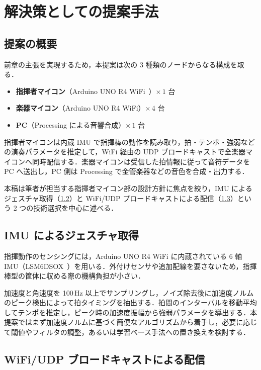 \section{解決策としての提案手法}
\label{sec:proposal}

\subsection{提案の概要}
\label{subsec:overview}

前章の主張を実現するため，本提案は次の 3 種類のノードからなる構成を取る．

\begin{itemize}
  \item \textbf{指揮者マイコン}（Arduino UNO R4 WiFi~\cite{arduino_uno_r4}）$\times\,1$ 台
  \item \textbf{楽器マイコン}（Arduino UNO R4 WiFi）$\times\,4$ 台
  \item \textbf{PC}（Processing による音響合成）$\times\,1$ 台
\end{itemize}

指揮者マイコンは内蔵 IMU で指揮棒の動作を読み取り，拍・テンポ・強弱などの演奏パラメータを推定して，WiFi 経由の UDP ブロードキャストで全楽器マイコンへ同時配信する．楽器マイコンは受信した拍情報に従って音符データを PC へ送出し，PC 側は Processing で金管楽器などの音色を合成・出力する．

本稿は筆者が担当する指揮者マイコン部の設計方針に焦点を絞り，IMU によるジェスチャ取得（\ref{subsec:imu_gesture}）と WiFi/UDP ブロードキャストによる配信（\ref{subsec:wifi_udp}）という 2 つの技術選択を中心に述べる．

\subsection{IMU によるジェスチャ取得}
\label{subsec:imu_gesture}

指揮動作のセンシングには，Arduino UNO R4 WiFi に内蔵されている 6 軸 IMU（LSM6DSOX~\cite{lsm6dsox}）を用いる．外付けセンサや追加配線を要さないため，指揮棒型の筐体に収める際の機構負担が小さい．

加速度と角速度を 100\,Hz 以上でサンプリングし，ノイズ除去後に加速度ノルムのピーク検出によって拍タイミングを抽出する．拍間のインターバルを移動平均してテンポを推定し，ピーク時の加速度振幅から強弱パラメータを導出する．本提案ではまず加速度ノルムに基づく簡便なアルゴリズムから着手し，必要に応じて閾値やフィルタの調整，あるいは学習ベース手法への置き換えを検討する．

\subsection{WiFi/UDP ブロードキャストによる配信}
\label{subsec:wifi_udp}

